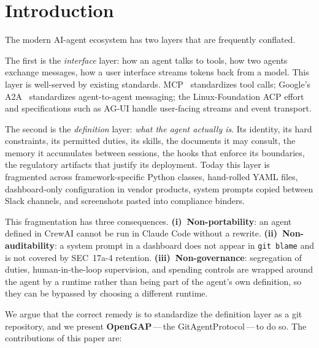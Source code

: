\documentclass[11pt,a4paper]{article}
\begin{document}
\section{Introduction}

The modern AI-agent ecosystem has two layers that are frequently conflated.

The first is the \emph{interface} layer: how an agent talks to tools, how two agents
exchange messages, how a user interface streams tokens back from a model. This layer is
well-served by existing standards. MCP~\cite{mcp2024} standardizes tool calls; Google's
A2A~\cite{a2a2024} standardizes agent-to-agent messaging; the Linux-Foundation ACP effort
and specifications such as AG-UI handle user-facing streams and event transport.

The second is the \emph{definition} layer: \emph{what the agent actually is}. Its
identity, its hard constraints, its permitted duties, its skills, the documents it may
consult, the memory it accumulates between sessions, the hooks that enforce its
boundaries, the regulatory artifacts that justify its deployment. Today this layer is
fragmented across framework-specific Python classes, hand-rolled YAML files,
dashboard-only configuration in vendor products, system prompts copied between Slack
channels, and screenshots pasted into compliance binders.

This fragmentation has three consequences. \textbf{(i)~Non-portability}: an agent
defined in CrewAI cannot be run in Claude Code without a rewrite.
\textbf{(ii)~Non-auditability}: a system prompt in a dashboard does not appear in
\texttt{git blame} and is not covered by SEC~17a-4 retention.
\textbf{(iii)~Non-governance}: segregation of duties, human-in-the-loop supervision,
and spending controls are wrapped around the agent by a runtime rather than being part
of the agent's own definition, so they can be bypassed by choosing a different
runtime.

We argue that the correct remedy is to standardize the definition layer as a git
repository, and we present \textbf{OpenGAP}\,---\,the GitAgentProtocol\,---\,to do
so. The contributions of this paper are:
\end{document}
